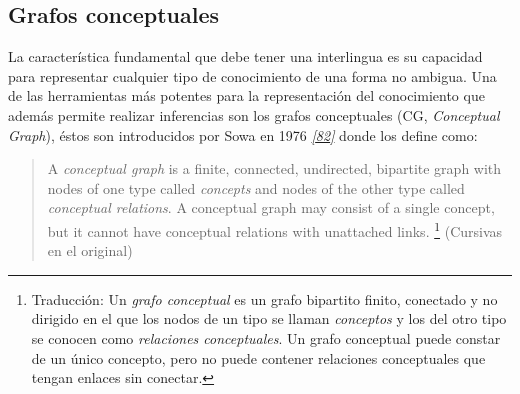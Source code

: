 \documentclass[a4paper,12pt,spanish]{book}
\begin{document}
\subsection{Grafos conceptuales}
\label{1.state-of-the-art/i.representacion-conocimiento:grafos-conceptuales}\label{1.state-of-the-art/i.representacion-conocimiento:id9}
La característica fundamental que debe tener una interlingua es su capacidad para
representar cualquier tipo de conocimiento de una forma no ambigua. Una de las
herramientas más potentes para la representación del conocimiento que además
permite realizar inferencias son los grafos conceptuales (CG, \emph{Conceptual Graph}),
éstos son introducidos por Sowa en 1976 \label{1.state-of-the-art/i.representacion-conocimiento:id10}{\hyperref[zreferences:sowa1976]{\emph{{[}82{]}}}} donde los define como:
\begin{quote}

A \emph{conceptual graph} is a finite, connected, undirected, bipartite graph with
nodes of one type called \emph{concepts} and nodes of the other type called
\emph{conceptual relations}. A conceptual graph may consist of a single concept,
but it cannot have conceptual relations with unattached links. \footnote{
Traducción: Un \emph{grafo conceptual} es un grafo bipartito finito, conectado y no
dirigido en el que los nodos de un tipo se llaman \emph{conceptos} y los del otro tipo se
conocen como \emph{relaciones conceptuales}. Un grafo conceptual puede constar de un único
concepto, pero no puede contener relaciones conceptuales que tengan enlaces sin conectar.
}
(Cursivas en el original)
\end{quote}
\end{document}
